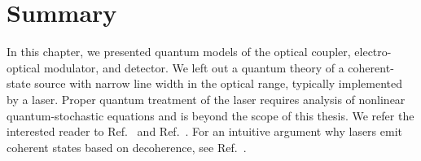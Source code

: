 \section*{Summary}

In this chapter, we presented quantum models of the optical coupler, electro-optical modulator, and detector.
We left out a quantum theory of a coherent-state source with narrow line width in the optical range, typically implemented by a laser.
Proper quantum treatment of the laser requires analysis of nonlinear quantum-stochastic equations and is beyond the scope of this thesis.
We refer the interested reader to Ref.~\cite[p.~900]{Mandel1995} and Ref.~\cite{Haken2012,Gardiner2000}.
For an intuitive argument why lasers emit coherent states based on decoherence, see Ref.~\cite{Gea1998}.

